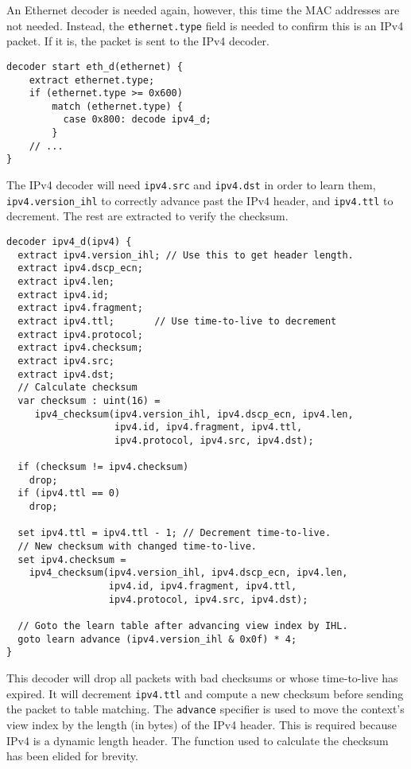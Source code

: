 An Ethernet decoder is needed again, however, this time the MAC
addresses are not needed. Instead, the \texttt{ethernet.type} field is needed to confirm
this is an IPv4 packet. If it is, the packet is sent to the IPv4 decoder.

\begin{codepage}
\begin{lstlisting}
decoder start eth_d(ethernet) {
	extract ethernet.type;
	if (ethernet.type >= 0x600)
	    match (ethernet.type) {
	      case 0x800: decode ipv4_d;
	    }
	// ...
}
\end{lstlisting}
\end{codepage}

The IPv4 decoder will need  \texttt{ipv4.src} and \texttt{ipv4.dst} in
order to learn them, \texttt{ipv4.version\_ihl} to
correctly advance past the IPv4 header, and \texttt{ipv4.ttl} to decrement. The rest are extracted to verify the checksum.

\begin{codepage}
\begin{lstlisting}
decoder ipv4_d(ipv4) {
  extract ipv4.version_ihl; // Use this to get header length.
  extract ipv4.dscp_ecn;
  extract ipv4.len;
  extract ipv4.id;
  extract ipv4.fragment;
  extract ipv4.ttl;       // Use time-to-live to decrement
  extract ipv4.protocol;
  extract ipv4.checksum;
  extract ipv4.src;
  extract ipv4.dst;
  // Calculate checksum
  var checksum : uint(16) =
     ipv4_checksum(ipv4.version_ihl, ipv4.dscp_ecn, ipv4.len, 
                   ipv4.id, ipv4.fragment, ipv4.ttl, 
                   ipv4.protocol, ipv4.src, ipv4.dst);
                   
  if (checksum != ipv4.checksum)
    drop;
  if (ipv4.ttl == 0)
    drop;
    
  set ipv4.ttl = ipv4.ttl - 1; // Decrement time-to-live.
  // New checksum with changed time-to-live.
  set ipv4.checksum =
    ipv4_checksum(ipv4.version_ihl, ipv4.dscp_ecn, ipv4.len, 
                  ipv4.id, ipv4.fragment, ipv4.ttl, 
                  ipv4.protocol, ipv4.src, ipv4.dst);

  // Goto the learn table after advancing view index by IHL.
  goto learn advance (ipv4.version_ihl & 0x0f) * 4;
}
\end{lstlisting}
\end{codepage}

This decoder will drop all packets with bad checksums or whose time-to-live has 
expired. It will decrement \texttt{ipv4.ttl} and compute a new checksum before 
sending the packet to table matching. The \texttt{advance} specifier is used to move the context's view index by the length (in bytes) of the IPv4 header. This is required because IPv4 is a dynamic length header. The function used to calculate the checksum
has been elided for brevity.

